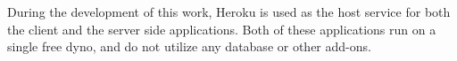 During the development of this work, Heroku is used as the host service for both the client and the server side applications.
Both of these applications run on a single free dyno, and do not utilize any database or other add-ons. 








